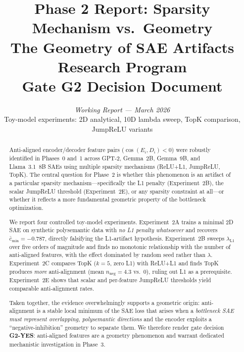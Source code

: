 \documentclass[11pt,a4paper]{article}
\title{\Large\bfseries Phase 2 Report: Sparsity Mechanism vs.\ Geometry\\[0.5em]
\large The Geometry of SAE Artifacts Research Program\\[0.3em]
\normalsize Gate G2 Decision Document}
\author{\textit{Working Report --- March 2026}\\[0.3em]
\small Toy-model experiments: 2D analytical, 10D lambda sweep, TopK comparison, JumpReLU variants}
\date{}
\newcommand{\cosED}{\cos(E_i, D_i)}
\newcommand{\nneg}{n_{\mathrm{neg}}}
\newcommand{\mcos}{\bar{c}_{\min}}
\newcommand{\lambdaL}{\lambda_{\mathrm{L1}}}
\begin{document}
\maketitle
\thispagestyle{fancy}

\begin{abstract}
\noindent Anti-aligned encoder/decoder feature pairs ($\cosED < 0$) were robustly identified in
Phases~0 and~1 across GPT-2, Gemma~2B, Gemma~9B, and Llama~3.1~8B SAEs using multiple
sparsity mechanisms (ReLU+L1, JumpReLU, TopK).  The central question for Phase~2
is whether this phenomenon is an artifact of a particular sparsity mechanism---specifically
the L1 penalty (Experiment~2B), the scalar JumpReLU threshold (Experiment~2E), or any
sparsity constraint at all---or whether it reflects a more fundamental geometric property of
the bottleneck optimization.

We report four controlled toy-model experiments.  Experiment~2A trains a minimal 2D SAE on
synthetic polysemantic data with \emph{no L1 penalty whatsoever} and recovers
$\mcos = -0.787$, directly falsifying the L1-artifact hypothesis.  Experiment~2B sweeps
$\lambdaL$ over five orders of magnitude and finds no monotonic relationship with the number
of anti-aligned features, with the effect dominated by random seed rather than $\lambda$.
Experiment~2C compares TopK ($k{=}5$, zero L1) with ReLU+L1 and finds TopK produces
\emph{more} anti-alignment (mean $\nneg{=}4.3$ vs.\ $0$), ruling out L1 as a prerequisite.
Experiment~2E shows that scalar and per-feature JumpReLU thresholds yield comparable
anti-alignment rates.

Taken together, the evidence overwhelmingly supports a geometric origin: anti-alignment
is a stable local minimum of the SAE loss that arises when a \emph{bottleneck SAE must
represent overlapping, polysemantic directions} and the encoder exploits a
``negative-inhibition'' geometry to separate them.  We therefore render gate decision
\textbf{G2-YES}: anti-aligned features are a geometry phenomenon and warrant dedicated
mechanistic investigation in Phase~3.
\end{abstract}

\medskip\noindent{}
\end{document}
